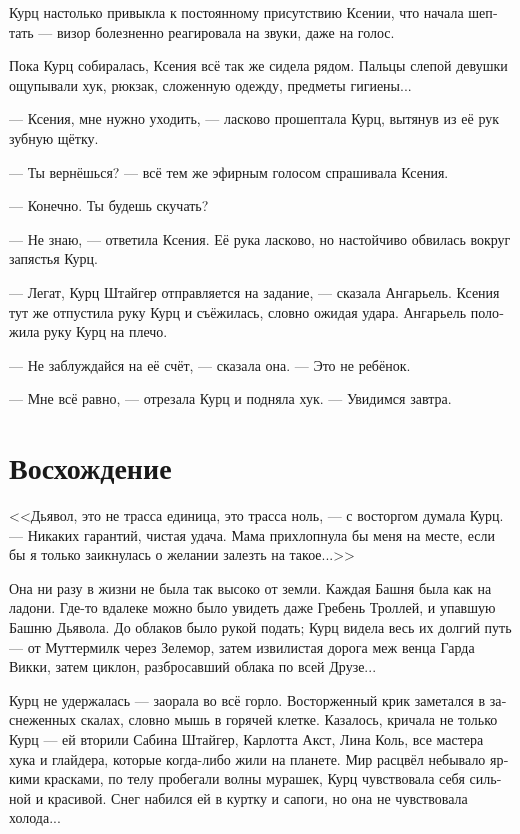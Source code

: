 \documentclass[a4paper,12pt,fleqn]{book}\usepackage{polyglossia}\setdefaultlanguage[babelshorthands=true]{russian}\setotherlanguage{english}\defaultfontfeatures{Ligatures=TeX,Mapping=tex-text}\usepackage{xcolor}\newcommand{\ml}[3]{#2}
\newcommand{\asterism}{\vspace{1em}{\centering\Large\bfseries$\ast~\ast~\ast$\par}\vspace{1em}}
\begin{document}
Курц настолько привыкла к постоянному присутствию Ксении, что начала шептать --- визор болезненно реагировала на звуки, даже на голос.

Пока Курц собиралась, Ксения всё так же сидела рядом.
Пальцы слепой девушки ощупывали хук, рюкзак, сложенную одежду, предметы гигиены...

--- Ксения, мне нужно уходить, --- ласково прошептала Курц, вытянув из её рук зубную щётку.

--- Ты вернёшься? --- всё тем же эфирным голосом спрашивала Ксения.

--- Конечно.
Ты будешь скучать?

--- Не знаю, --- ответила Ксения.
Её рука ласково, но настойчиво обвилась вокруг запястья Курц.

--- Легат, Курц Штайгер отправляется на задание, --- сказала Ангарьель.
Ксения тут же отпустила руку Курц и съёжилась, словно ожидая удара.
Ангарьель положила руку Курц на плечо.

--- Не заблуждайся на её счёт, --- сказала она.
--- Это не ребёнок.

--- Мне всё равно, --- отрезала Курц и подняла хук.
--- Увидимся завтра.

\section{Восхождение}

<<Дьявол, это не трасса единица, это трасса ноль, --- с восторгом думала Курц.
--- Никаких гарантий, чистая удача.
Мама прихлопнула бы меня на месте, если бы я только заикнулась о желании залезть на такое...>>

\asterism

Она ни разу в жизни не была так высоко от земли.
Каждая Башня была как на ладони.
Где-то вдалеке можно было увидеть даже Гребень Троллей, и упавшую Башню Дьявола.
До облаков было рукой подать;
Курц видела весь их долгий путь --- от Муттермилк через Зелемор, затем извилистая дорога меж венца Гарда Викки, затем циклон, разбросавший облака по всей Друзе...

Курц не удержалась --- заорала во всё горло.
Восторженный крик заметался в заснеженных скалах, словно мышь в горячей клетке.
Казалось, кричала не только Курц --- ей вторили Сабина Штайгер, Карлотта Акст, Лина Коль, все мастера хука и глайдера, которые когда-либо жили на планете.
Мир расцвёл небывало яркими красками, по телу пробегали волны мурашек, Курц чувствовала себя сильной и красивой.
Снег набился ей в куртку и сапоги, но она не чувствовала холода...
\end{document}
